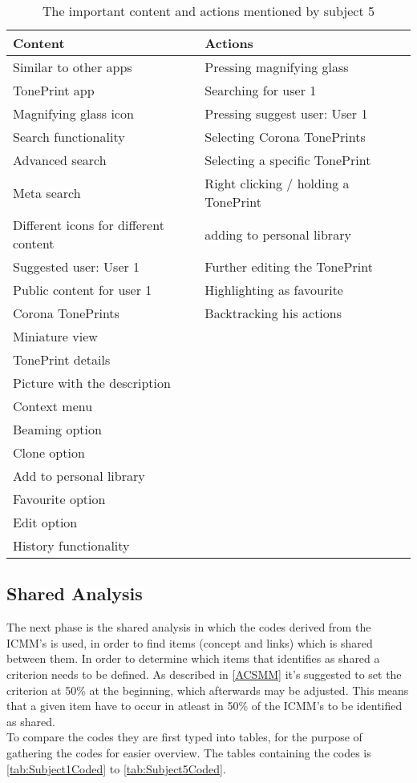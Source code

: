 \begin{table}[H]
\begin{minipage}[b]{\linewidth}\centering
	\begin{tabular} {|l|l|l|} \hline
		\rowcolor{xGray25} \textbf{Content} & \textbf{Actions} \\  \hline
		Similar to other apps & Pressing magnifying glass \\
		TonePrint app & Searching for user 1 \\
		Magnifying glass icon & Pressing suggest user: User 1 \\
		Search functionality & Selecting Corona TonePrints \\
		Advanced search & Selecting a specific TonePrint \\
		Meta search & Right clicking / holding a TonePrint \\
		Different icons for different content & adding to personal library \\
		Suggested user: User 1 & Further editing the TonePrint \\
		Public content for user 1 & Highlighting as favourite \\
		Corona TonePrints & Backtracking his actions \\
		Miniature view &  \\
		TonePrint details & \\
		Picture with the description & \\
		Context menu & \\
		Beaming option & \\
		Clone option & \\
		Add to personal library & \\
		Favourite option & \\
		Edit option & \\
		History functionality & \\ \hline
	\end{tabular}
	\caption{The important content and actions mentioned by subject 5}
	\label{tab:Subject5ContentActions}
\end{minipage}
\end{table}


\subsection{Shared Analysis}
\label{SharedAnalysis}
%
The next phase is the shared analysis in which the codes derived from the ICMM's is used, in order to find items (concept and links) which is shared between them. In order to determine which items that identifies as shared a criterion needs to be defined. As described in \autoref{ACSMM} it's suggested to set the criterion at 50\% at the beginning, which afterwards may be adjusted. This means that a given item have to occur in atleast in 50\% of the ICMM's to be identified as shared.\\
To compare the codes they are first typed into tables, for the purpose of gathering the codes for easier overview. The tables containing the codes is \autoref{tab:Subject1Coded} to \autoref{tab:Subject5Coded}. 

